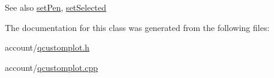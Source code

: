 \begin{DoxySeeAlso}{\-See also}
\hyperlink{classQCPItemPixmap_acdade1305edb4b5cae14f97fd132065f}{set\-Pen}, \hyperlink{classQCPAbstractItem_a203de94ad586cc44d16c9565f49d3378}{set\-Selected} 
\end{DoxySeeAlso}


\-The documentation for this class was generated from the following files\-:\begin{DoxyCompactItemize}
\item 
account/\hyperlink{qcustomplot_8h}{qcustomplot.\-h}\item 
account/\hyperlink{qcustomplot_8cpp}{qcustomplot.\-cpp}\end{DoxyCompactItemize}

